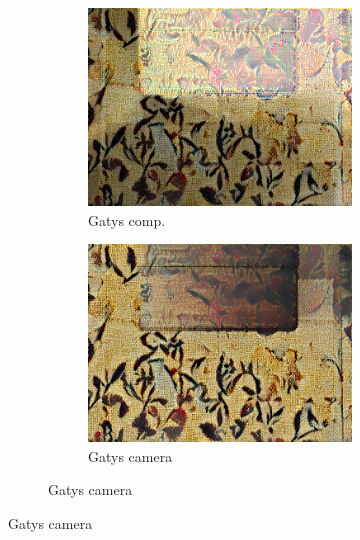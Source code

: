 \begin{figure}[]
\begin{subfigure}{\textwidth}
\begin{subfigure}{0.24\textwidth}
            \centering
            \includegraphics[width=\textwidth]{images/04-experiment02/carpet/flowers2/gatys_im.jpg}
            \caption*{Gatys comp.}
        \end{subfigure}
        \hfill
        \begin{subfigure}{0.24\textwidth}
            \centering
            \includegraphics[width=\textwidth]{images/04-experiment02/carpet/flowers2/gatys_proj.jpg}
            \caption*{Gatys camera}
        \end{subfigure}
        

\end{subfigure}
\end{figure}
